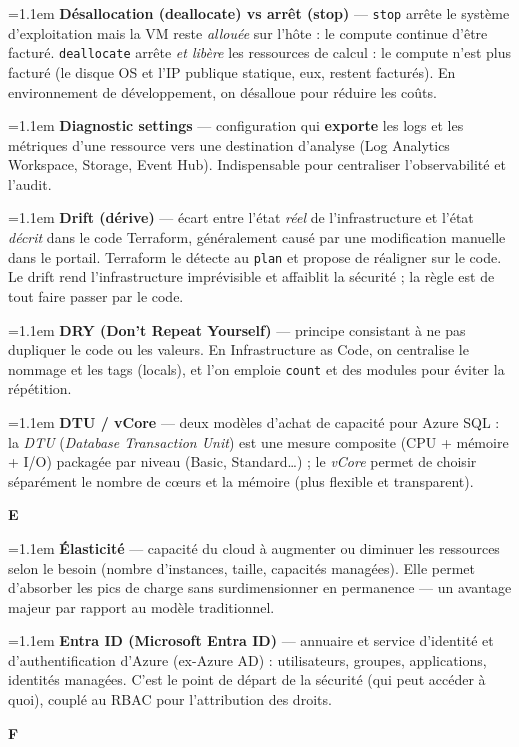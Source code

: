 \documentclass[11pt,a4paper]{article}
\newcommand{\co}[1]{\texttt{\small #1}}
\newcommand{\lettre}[1]{%
  \par\addvspace{9pt}\needspace{4.5\baselineskip}%
  \markright{#1}%
  {\noindent\sffamily\bfseries\Large\color{azure}#1}%
  \nobreak\vspace{0.4mm}{\color{azure!45}\hrule height 1pt}\nobreak\vspace{3mm}\par}
\newcommand{\df}[2]{%
  \par\addvspace{4pt}\needspace{2\baselineskip}%
  \hangindent=1.1em\hangafter=1
  {\sffamily\bfseries\color{azuredark}#1} — #2\par}
\begin{document}
\df{Désallocation (deallocate) vs arrêt (stop)}{\co{stop} arrête le système d'exploitation mais la VM reste \emph{allouée} sur l'hôte : le compute continue d'être facturé. \co{deallocate} arrête \emph{et libère} les ressources de calcul : le compute n'est plus facturé (le disque OS et l'IP publique statique, eux, restent facturés). En environnement de développement, on désalloue pour réduire les coûts.}

\df{Diagnostic settings}{configuration qui \textbf{exporte} les logs et les métriques d'une ressource vers une destination d'analyse (Log Analytics Workspace, Storage, Event Hub). Indispensable pour centraliser l'observabilité et l'audit.}

\df{Drift (dérive)}{écart entre l'état \emph{réel} de l'infrastructure et l'état \emph{décrit} dans le code Terraform, généralement causé par une modification manuelle dans le portail. Terraform le détecte au \co{plan} et propose de réaligner sur le code. Le drift rend l'infrastructure imprévisible et affaiblit la sécurité ; la règle est de tout faire passer par le code.}

\df{DRY (Don't Repeat Yourself)}{principe consistant à ne pas dupliquer le code ou les valeurs. En Infrastructure as Code, on centralise le nommage et les tags (locals), et l'on emploie \co{count} et des modules pour éviter la répétition.}

\df{DTU / vCore}{deux modèles d'achat de capacité pour Azure SQL : la \emph{DTU} (\emph{Database Transaction Unit}) est une mesure composite (CPU + mémoire + I/O) packagée par niveau (Basic, Standard\dots) ; le \emph{vCore} permet de choisir séparément le nombre de cœurs et la mémoire (plus flexible et transparent).}

\lettre{E}

\df{Élasticité}{capacité du cloud à augmenter ou diminuer les ressources selon le besoin (nombre d'instances, taille, capacités managées). Elle permet d'absorber les pics de charge sans surdimensionner en permanence — un avantage majeur par rapport au modèle traditionnel.}

\df{Entra ID (Microsoft Entra ID)}{annuaire et service d'identité et d'authentification d'Azure (ex-Azure AD) : utilisateurs, groupes, applications, identités managées. C'est le point de départ de la sécurité (qui peut accéder à quoi), couplé au RBAC pour l'attribution des droits.}

\lettre{F}
\end{document}
